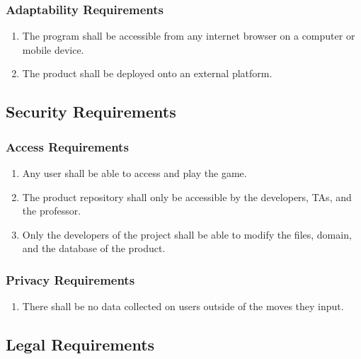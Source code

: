 \documentclass[12pt, titlepage]{article}
\begin{document}
    \subsubsection{Adaptability Requirements}
    \begin{enumerate}[{MS}1., leftmargin=2\parindent, resume]
    	\item The program shall be accessible from any internet browser on a computer or mobile device.
    	\item The product shall be deployed onto an external platform.
    \end{enumerate}
    
    
    \subsection{Security Requirements}
    
    \subsubsection{Access Requirements}
    \begin{enumerate}[{SR}1., leftmargin=2\parindent]
    	\item Any user shall be able to access and play the game.
    	\item The product repository shall only be accessible by the developers, TAs, and the professor.
    	\item Only the developers of the project shall be able to modify the files, domain, and the database of the product.
    \end{enumerate}
    
    \subsubsection{Privacy Requirements}
    \begin{enumerate}[{SR}1., leftmargin=2\parindent, resume]
    	\item There shall be no data collected on users outside of the moves they input.
    \end{enumerate}
    
    \subsection{Legal Requirements}
    
\end{document}
